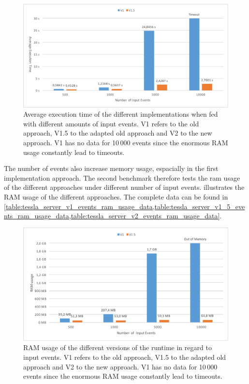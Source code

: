\begin{figure}[!htb]
  \includegraphics[width=\textwidth]{gfx/runtime_num_events_benchmark}
  \caption[Average execution time of the different implementations when fed with different amounts of input events.]{Average execution time of the different implementations when fed with different amounts of input events. V1 refers to the old approach, V1.5 to the adapted old approach and V2 to the new approach. V1 has no data for 10\,000 events since the enormous RAM usage constantly lead to timeouts.}
\label{fig:chap_eval:runtime_num_events}
\end{figure}

The number of events also increase memory usage, espacially in the first implementation approach.
The second benchmark therefore tests the ram usage of the different approaches under different number of input events.
 illustrates the RAM usage of the different approaches.
The complete data can be found in \cref{table:tessla_server_v1_events_ram_usage_data,table:tessla_server_v1_5_events_ram_usage_data,table:tessla_server_v2_events_ram_usage_data}.

\begin{figure}[!htb]
  \includegraphics[width=\textwidth]{gfx/runtime_ram_usage_benchmark}
  \caption[RAM usage of the different versions of the runtime]{RAM usage of the different versions of the runtime in regard to input events. V1 refers to the old approach, V1.5 to the adapted old approach and V2 to the new approach. V1 has no data for 10\,000 events since the enormous RAM usage constantly lead to timeouts.}
\label{fig:chap_eval:runtime_ram_usage}
\end{figure}

